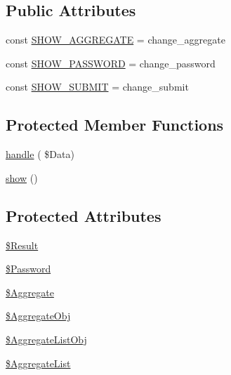 \subsection*{Public Attributes}
\begin{DoxyCompactItemize}
\item 
const \hyperlink{class_page_show_aggregate_a418c589eaa129c3f895745624cd95f3c}{S\+H\+O\+W\+\_\+\+A\+G\+G\+R\+E\+G\+A\+TE} = \textquotesingle{}change\+\_\+aggregate\textquotesingle{}
\item 
const \hyperlink{class_page_show_aggregate_acec417faac863a80d5f66f0929fa64b1}{S\+H\+O\+W\+\_\+\+P\+A\+S\+S\+W\+O\+RD} = \textquotesingle{}change\+\_\+password\textquotesingle{}
\item 
const \hyperlink{class_page_show_aggregate_a6ede66ef73c418c0e99059c1790a5e9a}{S\+H\+O\+W\+\_\+\+S\+U\+B\+M\+IT} = \textquotesingle{}change\+\_\+submit\textquotesingle{}
\end{DoxyCompactItemize}
\subsection*{Protected Member Functions}
\begin{DoxyCompactItemize}
\item 
\hyperlink{class_page_show_aggregate_afc4bd6c13d8f52ef14bb372abe533db2}{handle} ( \$Data)
\item 
\hyperlink{class_page_show_aggregate_aa314c7c81c17209770ea207979ca484e}{show} ()
\end{DoxyCompactItemize}
\subsection*{Protected Attributes}
\begin{DoxyCompactItemize}
\item 
\hyperlink{class_page_show_aggregate_aead59d1ee42f7fcec7ddbb2d36c5cf92}{\$\+Result}
\item 
\hyperlink{class_page_show_aggregate_acc0bf113b27e61e5c1387c9732cf788b}{\$\+Password}
\item 
\hyperlink{class_page_show_aggregate_a4aa5098e8e93a0bc7405b62516570506}{\$\+Aggregate}
\item 
\hyperlink{class_page_show_aggregate_ab62dbd4c2a47f13054257627290987d6}{\$\+Aggregate\+Obj}
\item 
\hyperlink{class_page_show_aggregate_a1810628506f8763a54b81f65264d50ea}{\$\+Aggregate\+List\+Obj}
\item 
\hyperlink{class_page_show_aggregate_a31fa03f3225dfd645217450d8c5b946f}{\$\+Aggregate\+List}
\end{DoxyCompactItemize}



